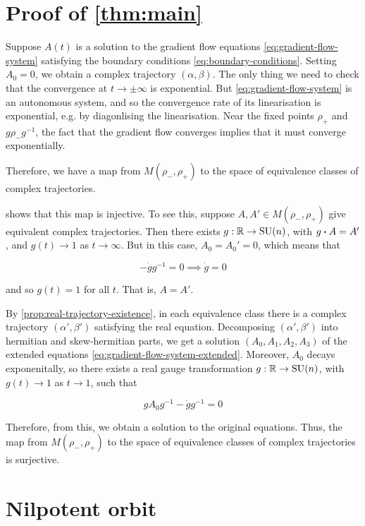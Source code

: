 \documentclass{report}
\DeclareMathOperator{\SU}{SU}
\begin{document}
\section{Proof of \cref{thm:main}}

Suppose \(A(t)\) is a solution to the gradient flow equations \cref{eq:gradient-flow-system} satisfying the boundary conditions \cref{eq:boundary-conditions}. Setting \(A_0 = 0\), we obtain a complex trajectory \((\alpha, \beta)\). The only thing we need to check that the convergence at \(t \to \pm\infty\) is exponential. But \cref{eq:gradient-flow-system} is an autonomous system, and so the convergence rate of its linearisation is exponential, e.g. by diagonlising the linearisation. Near the fixed points \(\rho_+\) and \(g\rho_-g^{-1}\), the fact that the gradient flow converges implies that it must converge exponentially.

Therefore, we have a map from \(M(\rho_-, \rho_+)\) to the space of equivalence classes of complex trajectories. 

 shows that this map is injective. To see this, suppose \(A, A' \in M(\rho_-, \rho_+)\) give equivalent complex trajectories. Then there exists \(g : \R \to \SU(n)\), with \(g \vdot A = A'\), and \(g(t) \to 1\) as \(t \to \infty\). But in this case, \(A_0 = A_0' = 0\), which means that

\[-\dot g g^{-1} = 0 \implies \dot g = 0\]

and so \(g(t) = 1\) for all \(t\). That is, \(A = A'\).

By \cref{prop:real-trajectory-existence}, in each equivalence class there is a complex trajectory \((\alpha', \beta')\) satisfying the real equation. Decomposing \((\alpha', \beta')\) into hermitian and skew-hermitian parts, we get a solution \((A_0, A_1, A_2, A_3)\) of the extended equations \cref{eq:gradient-flow-system-extended}. Moreover, \(A_0\) decays exponenitally, so there exists a real gauge transformation \(g : \R \to \SU(n)\), with \(g(t) \to 1\) as \(t \to 1\), such that

\[gA_0g^{-1} - \dot g g^{-1} = 0\]

Therefore, from this, we obtain a solution to the original equations. Thus, the map from \(M(\rho_-, \rho_+)\) to the space of equivalence classes of complex trajectories is surjective.

\label{sec:proof}

\section{Nilpotent orbit}
\end{document}
